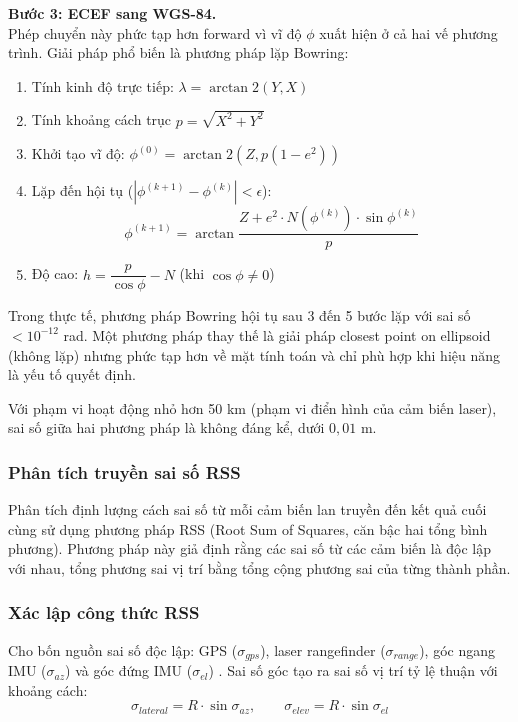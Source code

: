 \textbf{Bước 3: ECEF sang WGS-84.\\} Phép chuyển này phức tạp hơn forward vì vĩ độ $\phi$ xuất hiện ở cả hai vế phương trình. Giải pháp phổ biến là phương pháp lặp Bowring:
\begin{enumerate}
    \item Tính kinh độ trực tiếp: $\lambda = \arctan2(Y, X)$
    \item Tính khoảng cách trục $p = \sqrt{X^2 + Y^2}$
    \item Khởi tạo vĩ độ: $\phi^{(0)} = \arctan2\left(Z, p(1 - e^2)\right)$
    \item Lặp đến hội tụ ($|\phi^{(k+1)} - \phi^{(k)}| < \epsilon$):
    \begin{equation}
        \phi^{(k+1)} = \arctan\frac{Z + e^2 \cdot N(\phi^{(k)}) \cdot \sin\phi^{(k)}}{p}
    \end{equation}
    \item Độ cao: $h = \dfrac{p}{\cos\phi} - N$ (khi $\cos\phi \neq 0$)
\end{enumerate}

Trong thực tế, phương pháp Bowring hội tụ sau 3 đến 5 bước lặp với sai số $< 10^{-12}$ rad. Một phương pháp thay thế là giải pháp closest point on ellipsoid (không lặp) nhưng phức tạp hơn về mặt tính toán và chỉ phù hợp khi hiệu năng là yếu tố quyết định.

Với phạm vi hoạt động nhỏ hơn 50 km (phạm vi điển hình của cảm biến laser), sai số giữa hai phương pháp là không đáng kể, dưới $0{,}01$ m.

\subsubsection{Phân tích truyền sai số RSS}

\hspace{0.5cm} Phân tích định lượng cách sai số từ mỗi cảm biến lan truyền đến kết quả cuối cùng sử dụng phương pháp RSS (Root Sum of Squares, căn bậc hai tổng bình phương). Phương pháp này giả định rằng các sai số từ các cảm biến là độc lập với nhau, tổng phương sai vị trí bằng tổng cộng phương sai của từng thành phần.

\subsubsection{Xác lập công thức RSS}
\hspace{0.5cm} Cho bốn nguồn sai số độc lập: GPS ($\sigma_{gps}$), laser rangefinder ($\sigma_{range}$), góc ngang IMU ($\sigma_{az}$) và góc đứng IMU ($\sigma_{el}$) \cite{titterton2004strapdown}. Sai số góc tạo ra sai số vị trí tỷ lệ thuận với khoảng cách:
\begin{equation}
    \sigma_{lateral} = R \cdot \sin\sigma_{az}, \qquad \sigma_{elev} = R \cdot \sin\sigma_{el}
\end{equation}


